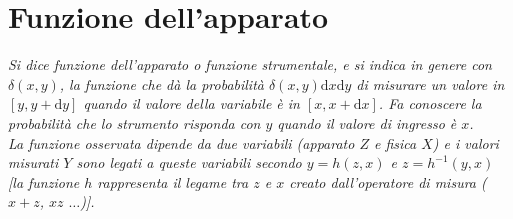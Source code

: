 \section{Funzione dell'apparato} %
\label{sec:funzione-apparato}
\emph{Si dice funzione dell'apparato o funzione strumentale, e si indica in genere con $\delta(x,y)$, la funzione che dà la probabilità $\delta(x,y)\textrm{d}x\textrm{d}y$ di misurare un valore in $[y, y+\textrm{d}y]$ quando il valore della variabile è in $[x, x+\textrm{d}x]$. Fa conoscere la probabilità che lo strumento risponda con $y$ quando il valore di ingresso è $x$. \\ La funzione osservata dipende da due variabili (apparato $Z$ e fisica $X$) e i valori misurati $Y$ sono legati a queste variabili secondo $y=h(z,x)$ e $z=h^{-1}(y,x)$ [la funzione $h$ rappresenta il legame tra $z$ e $x$ creato dall'operatore di misura ($x+z$, $xz$ $\dots$)].}
